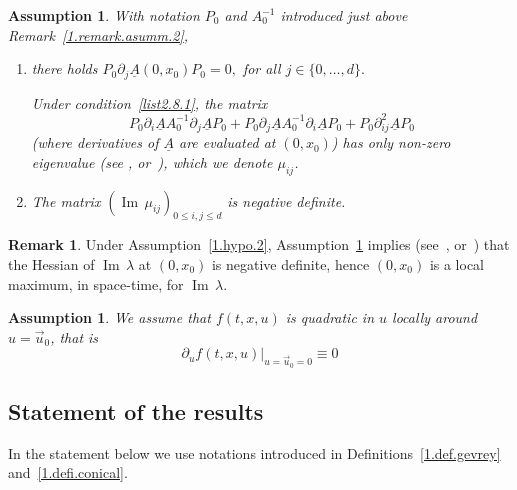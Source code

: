 \documentclass[10pt]{amsart}
\theoremstyle{definition}
\newtheorem{rema}[cdrthm]{Remark}
\theoremstyle{plain}
\newtheorem{hypo}[cdrthm]{Assumption} }
\newcommand{\dptl}{\partial}%
\DeclareMathOperator{\Imm}{Im}
\newcommand*{\romanenumi}{\renewcommand*{\theenumi}{\roman{enumi}}}
\begin{document}
\begin{hypo}\label{1.hypo.3}
With notation $P_0$ and $A_0^{-1}$ introduced just above Remark~\ref{1.remark.asumm.2},
\begin{enumerate}\romanenumi
\item \label{list2.8.1} there holds $P_0 \dptl_j \underline A(0,x_0) P_0 = 0,$ for all $j \in \{0, \dots, d\}.$

\emph{Under condition~\eqref{list2.8.1}, the matrix
\begin{equation}\label{1.local.assum.2}
P_0 \dptl_i \underline A A_0^{-1} \dptl_j \underline A P_0 + P_0 \dptl_j \underline A A_0^{-1} \dptl_i \underline A P_0 + P_0 \dptl_{ij}^2 \underline A P_0
\end{equation}
(where derivatives of $\underline A$ are evaluated at $(0,x_0)$) has only non-zero eigenvalue (see \cite{kato2013perturbation}, or~\cite[Proposition~2.6]{texier2004short}), which we denote $\mu_{ij}$.}
\item \label{list2.8.2}The matrix $({\Imm} \, \mu_{ij})_{0\leq i,j\leq d}$ is negative definite.
\end{enumerate}
\end{hypo}

\begin{rema}\label{1.remark.asum.3}
Under Assumption~\ref{1.hypo.2}, Assumption~\ref{1.hypo.3} implies (see~\cite{kato2013perturbation}, or~\cite[Proposition~2.6]{texier2004short}) that the Hessian of ${\Imm} \, \lambda$ at $(0,x_0)$ is negative definite, hence $(0,x_0)$ is a local maximum, in space-time, for ${\Imm} \, \lambda.$
\end{rema}

\begin{hypo}\label{1.hypo.4}
We assume that $f(t,x,u)$ is quadratic in $u$ locally around $u=\vec{u}_0$, that is
\begin{equation}\label{1.hypo.f}
\dptl_{u} f(t,x,u) \big|_{u=\vec{u}_0=0} \equiv 0
\end{equation}
\end{hypo}



\subsection{Statement of the results}\label{1.subsection.result}

In the statement below we use notations introduced in Definitions~\ref{1.def.gevrey} and~\ref{1.defi.conical}.
\end{document}

